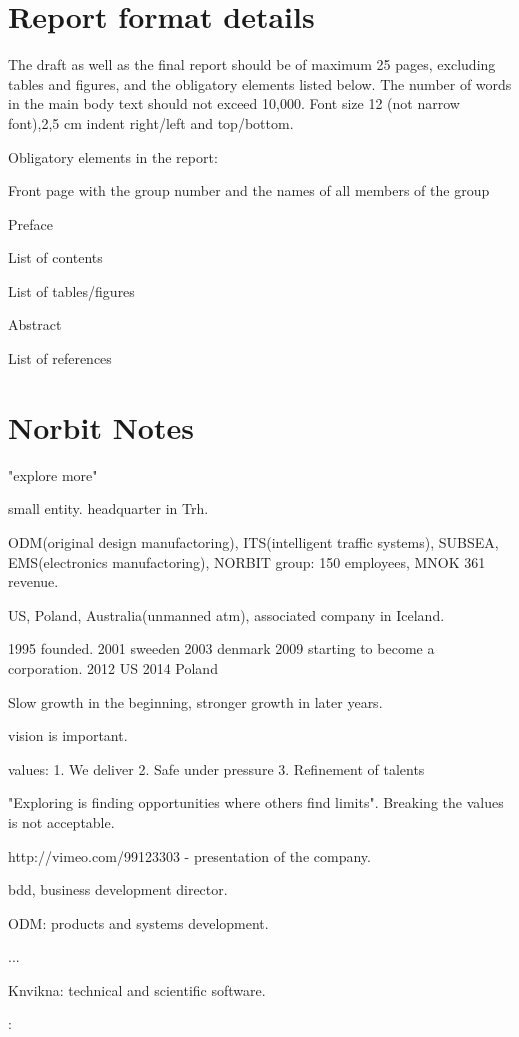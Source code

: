 \documentclass[12pt, a4paper]{article}
\begin{document}
\section{Report format details}
The draft as well as the final report should be of maximum 25 pages, excluding
tables and figures, and the obligatory elements listed below. The number of
words in the main body text should not exceed 10,000. Font size 12 (not narrow
font),2,5 cm indent right/left and top/bottom.

Obligatory elements in the report:

Front page with the group number and the names of all members of the group

Preface

List of contents

List of tables/figures

Abstract

List of references

\section{Norbit Notes}

"explore more"

small entity. 
headquarter in Trh. 

ODM(original design manufactoring), ITS(intelligent traffic systems), SUBSEA,
EMS(electronics manufactoring), 
NORBIT group: 150 employees, MNOK 361 revenue. 

US, Poland, Australia(unmanned atm), associated company in Iceland. 

1995 founded. 
2001 sweeden
2003 denmark
2009 starting to become a corporation. 
2012 US
2014 Poland

Slow growth in the beginning, stronger growth in later years.

vision is important.  

values: 
1. We deliver
2. Safe under pressure
3. Refinement of talents

"Exploring is finding opportunities where others find limits". 
Breaking the values is not acceptable. 

http://vimeo.com/99123303 - presentation of the company. 

bdd, business development director. 

ODM: 
products and systems development. 

...

Knvikna: technical and scientific software. 

:
\end{document}
